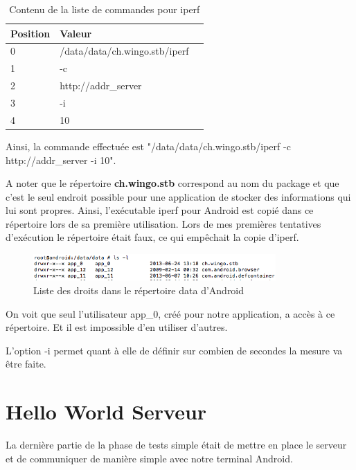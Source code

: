 \begin{table}[H]
\begin{tabularx}{\textwidth}{|m{3cm}|X|l|}
  \hline
  \bf{Position} & \bf{Valeur} \\
  \hline
  0 & /data/data/ch.wingo.stb/iperf \\
  \hline  
  1 & -c\\
  \hline  
  2 & http://addr\_server \\
  \hline  
  3 & -i \\
  \hline  
  4 & 10\\
  \hline
\end{tabularx}
\caption{Contenu de la liste de commandes pour iperf}
\label{tab:classDiagram}
\end{table}

\medskip

Ainsi, la commande effectuée est "/data/data/ch.wingo.stb/iperf -c http://addr\_server -i 10".

\medskip

A noter que le répertoire \textbf{ch.wingo.stb} correspond au nom du package et que c'est le seul endroit possible pour une application de stocker des informations qui lui sont propres. Ainsi, l'exécutable iperf pour Android est copié dans ce répertoire lors de sa première utilisation. Lors de mes premières tentatives d'exécution le répertoire était faux, ce qui empêchait la copie d'iperf.
\begin{figure}[H]
      \centering
      \includegraphics[width=350px]{00_media/droit_repertoire_data}
      \caption{Liste des droits dans le répertoire data d'Android}
      \label{gra:maqmenu}
\end{figure}

\medskip

On voit que seul l'utilisateur app\_0, créé pour notre application, a accès à ce répertoire. Et il est impossible d'en utiliser d'autres.

\medskip

L'option -i permet quant à elle de définir sur combien de secondes la mesure va être faite.

\section{Hello World Serveur}
La dernière partie de la phase de tests simple était de mettre en place le serveur et de communiquer de manière simple avec notre terminal Android.

